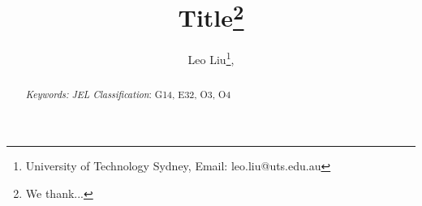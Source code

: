 \documentclass[12pt]{article} %
\begin{document}
	
\author{
	Leo Liu\footnote{University of Technology Sydney, Email: leo.liu@uts.edu.au},
}

\title{Title\footnote{We thank...}}

\maketitle
\vspace{-0.5cm}

\onehalfspacing

\begin{abstract}

	\vspace{0.5cm}
	\noindent \emph{Keywords:} 	
  \vspace{0.2cm}
	\noindent \emph{JEL Classification}: G14, E32, O3, O4

\end{abstract}

\thispagestyle{empty}

\clearpage
 
 
 
 
 

\newpage
\FloatBarrier
\singlespace
\begin{multicols}{2}
	
	{\footnotesize
		
	}
\end{multicols}

\clearpage
\FloatBarrier

\begin{appendix}
\renewcommand{\thethm}{A\arabic{thm}}%
\renewcommand{\theprop}{A\arabic{prop}}%
\renewcommand{\thedefn}{A\arabic{defn}}%
\renewcommand{\theequation}{A\arabic{equation}}%
\renewcommand{\thecor}{A\arabic{cor}}%
\renewcommand{\thelemma}{A\arabic{lemma}}
\renewcommand{\thefigure}{A\arabic{figure}}
\renewcommand{\thetable}{A\arabic{table}}

\setcounter{table}{0}
\setcounter{figure}{0}

	 

\renewcommand{\thethm}{B\arabic{thm}}%
\renewcommand{\theprop}{B\arabic{prop}}%
\renewcommand{\thedefn}{B\arabic{defn}}%
\renewcommand{\theequation}{B\arabic{equation}}%
\renewcommand{\thecor}{B\arabic{cor}}%
\renewcommand{\thelemma}{B\arabic{lemma}}
\renewcommand{\thefigure}{B\arabic{figure}}
\renewcommand{\thetable}{B\arabic{table}}

\setcounter{table}{0}
\setcounter{figure}{0}

	 
\end{appendix}
\end{document}

